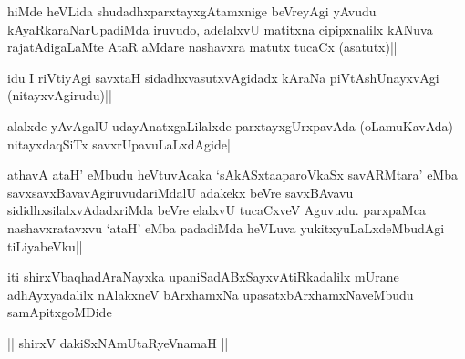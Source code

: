 \begin{artha}
hiMde heVLida shudadhxparxtayxgAtamxnige beVreyAgi yAvudu kAyaRkaraNarUpadiMda iruvudo, adelalxvU matitxna cipipxnalilx kANuva rajatAdigaLaMte AtaR aMdare nashavxra matutx tucaCx (asatutx)||
\end{artha}

\begin{artha}
idu I riVtiyAgi savxtaH sidadhxvasutxvAgidadx kAraNa piVtAshUnayxvAgi (nitayxvAgirudu)||

alalxde yAvAgalU udayAnatxgaLilalxde parxtayxgUrxpavAda (oLamuKavAda) nitayxdaqSiTx savxrUpavuLaLxdAgide||
\end{artha}


\begin{artha}
athavA ataH' eMbudu heVtuvAcaka `sAkASxtaaparoVkaSx savARMtara' eMba savxsavxBavavAgiruvudariMdalU adakekx beVre savxBAvavu sididhxsilalxvAdadxriMda beVre elalxvU tucaCxveV Aguvudu. parxpaMca nashavxratavxvu `ataH' eMba padadiMda heVLuva yukitxyuLaLxdeMbudAgi tiLiyabeVku||
\end{artha}

\begin{center}
iti shirxVbaqhadAraNayxka upaniSadABxSayxvAtiRkadalilx mUrane adhAyxyadalilx nAlakxneV bArxhamxNa upasatxbArxhamxNaveMbudu samApitxgoMDide 

|| shirxV dakiSxNAmUtaRyeVnamaH ||
\end{center}
